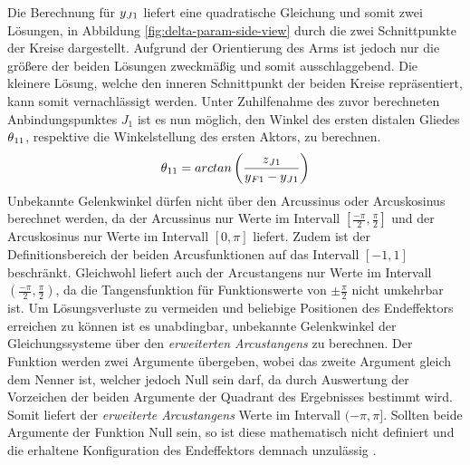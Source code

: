 \documentclass[Bachelor, BMR, ngerman]{twbook}
\begin{document}
    \noindent
    Die Berechnung für $y\textsubscript{$J1$}$ liefert eine quadratische Gleichung und somit zwei Lösungen, in Abbildung \ref{fig:delta-param-side-view} durch die zwei Schnittpunkte der Kreise dargestellt. Aufgrund der Orientierung des Arms ist jedoch nur die größere der beiden Lösungen zweckmäßig und somit ausschlaggebend. Die kleinere Lösung, welche den inneren Schnittpunkt der beiden Kreise repräsentiert, kann somit vernachlässigt werden.
    Unter Zuhilfenahme des zuvor berechneten Anbindungspunktes $J_1$ ist es nun möglich, den Winkel des ersten distalen Gliedes $\theta\textsubscript{11}$, respektive die Winkelstellung des ersten Aktors, zu berechnen.
    \newline
    \begin{align}
        \theta\textsubscript{11} = arctan\left(\frac{z\textsubscript{$J1$}}{y\textsubscript{$F1$} - y\textsubscript{$J1$}}\right)
        \label{eq:theta11}
    \end{align}
    \noindent
    Unbekannte Gelenkwinkel dürfen nicht über den Arcussinus oder Arcuskosinus berechnet werden, da der Arcussinus nur Werte im Intervall $[\frac{-\pi}{2}, \frac{\pi}{2}]$ und der Arcuskosinus nur Werte im Intervall $[0, \pi]$ liefert. Zudem ist der Definitionsbereich der beiden Arcusfunktionen auf das Intervall $[-1, 1]$ beschränkt. Gleichwohl liefert auch der Arcustangens nur Werte im Intervall $(\frac{-\pi}{2}, \frac{\pi}{2})$, da die Tangensfunktion für Funktionswerte von $\pm \frac{\pi}{2}$ nicht umkehrbar ist. Um Lösungsverluste zu vermeiden und beliebige Positionen des Endeffektors erreichen zu können ist es unabdingbar, unbekannte Gelenkwinkel der Gleichungssysteme über den \textit{erweiterten Arcustangens} zu berechnen. Der Funktion werden zwei Argumente übergeben, wobei das zweite Argument gleich dem Nenner ist, welcher jedoch Null sein darf, da durch Auswertung der Vorzeichen der beiden Argumente der Quadrant des Ergebnisses bestimmt wird. Somit liefert der \textit{erweiterte Arcustangens} Werte im Intervall $(-\pi, \pi]$. Sollten beide Argumente der Funktion Null sein, so ist diese mathematisch nicht definiert und die erhaltene Konfiguration des Endeffektors demnach unzulässig \cite{We08}.\\
\end{document}
